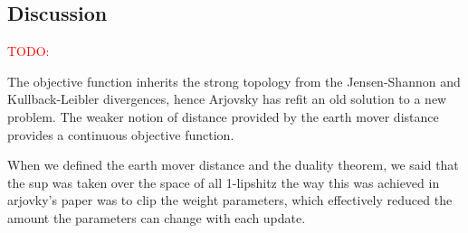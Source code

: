 \subsection{Discussion}
\textcolor{red}{TODO:}

The objective function inherits the strong topology from the
Jensen-Shannon and Kullback-Leibler divergences, hence Arjovsky has
refit an old solution to a new problem. The weaker notion of distance
provided by the earth mover distance provides a continuous objective
function.

When we defined the earth mover distance and the duality theorem, we
said that the sup was taken over the space of all 1-lipshitz
the way this was achieved in arjovky's paper was to clip the weight
parameters, which effectively reduced the amount the parameters can
change with each update.

